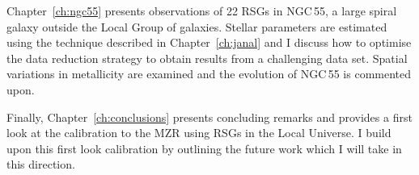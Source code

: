 Chapter~\ref{ch:ngc55} presents observations of 22 RSGs in NGC\,55, a large spiral galaxy outside the Local Group of galaxies.
Stellar parameters are estimated using the technique described in Chapter~\ref{ch:janal} and I discuss how to optimise the data reduction strategy to obtain results from a challenging data set.
Spatial variations in metallicity are examined and the evolution of NGC\,55 is commented upon.


Finally, Chapter~\ref{ch:conclusions} presents concluding remarks and provides a first look at the calibration to the MZR using RSGs in the Local Universe.
I build upon this first look calibration by outlining the future work which I will take in this direction.

% 

